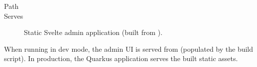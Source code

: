 \begin{description}
\item[Path] 
\item[Serves] Static Svelte admin application (built from
  ).
\end{description}

When running in dev mode, the admin UI is served from
 (populated
by the build script). In production, the Quarkus application serves the
built static assets.
